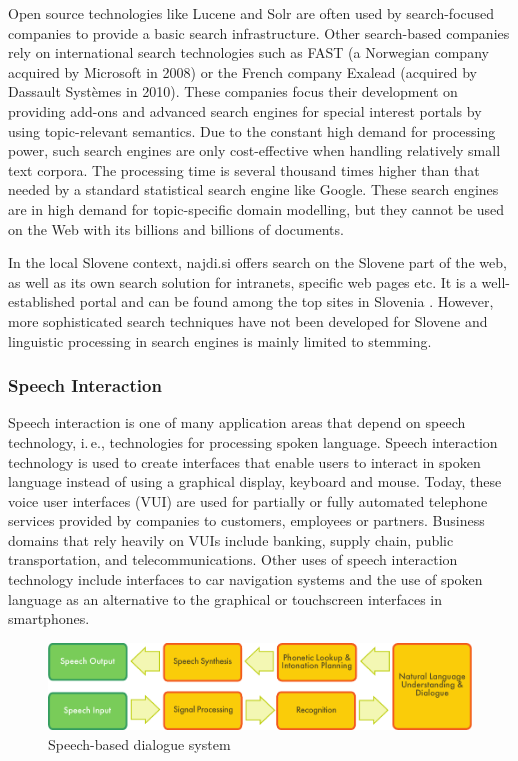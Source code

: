\begin{multicols}{2}
Open source technologies like Lucene and Solr are often used by search-focused companies to provide a basic search infrastructure. Other search-based companies rely on international search technologies such as FAST (a Norwegian company acquired by Microsoft in 2008) or the French company Exalead (acquired by Dassault Systèmes in 2010). These companies focus their development on providing add-ons and advanced search engines for special interest portals by using topic-relevant semantics. Due to the constant high demand for processing power, such search engines are only cost-effective when handling relatively small text corpora. The processing time is several thousand times higher than that needed by a standard statistical search engine like Google. These search engines are in high demand for topic-specific domain modelling, but they cannot be used on the Web with its billions and billions of documents.

In the local Slovene context, najdi.si offers search on the Slovene part of the web, as well as its own search solution for intranets, specific web pages etc. It is a well-established portal and can be found among the top sites in Slovenia \cite{moss1}.  However, more sophisticated search techniques have not been developed for Slovene and linguistic processing in search engines is mainly limited to stemming. 

\subsubsection{Speech Interaction}

Speech interaction is one of many application areas that depend on speech technology, i.\,e., technologies for processing spoken language. Speech interaction technology is used to create interfaces that enable users to interact in spoken language instead of using a graphical display, keyboard and mouse.  Today, these voice user interfaces (VUI) are used for partially or fully automated telephone services provided by companies to customers, employees or partners. Business domains that rely heavily on VUIs include banking, supply chain, public transportation, and telecommunications. Other uses of speech interaction technology include interfaces to car navigation systems and the use of spoken language as an alternative to the graphical or touchscreen interfaces in smartphones.

\begin{figure}[htb]
  \center
  \includegraphics[width=\textwidth]{../_media/english/simple_speech-based_dialogue_architecture}
  \caption{Speech-based dialogue system}
  \label{fig:dialoguearch_en}
\end{figure}


\end{multicols}
